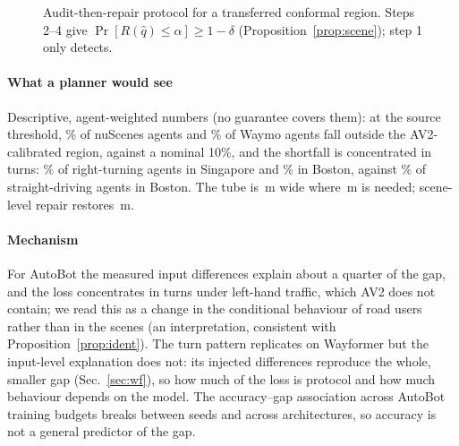 \begin{figure}[t]
\centering
{}
\caption{Audit-then-repair protocol for a transferred conformal region. Steps 2--4 give $\Pr[R(\hat q)\le\alpha]\ge1-\delta$
(Proposition~\ref{prop:scene}); step 1 only detects.}
\label{fig:protocol}
\end{figure}

\paragraph{What a planner would see} Descriptive, agent-weighted numbers (no guarantee covers them): at the source
threshold, \missAgentsAvNs\% of nuScenes agents and \missAgentsAvWm\% of Waymo agents fall outside the AV2-calibrated
region, against a nominal 10\%, and the shortfall is concentrated in turns: \missRightSg\% of right-turning agents in
Singapore and \missRightBos\% in Boston, against \missStraightBos\% of straight-driving agents in Boston. The tube is
\qSrcAvNs\,m wide where \qOracleAvNs\,m is needed; scene-level repair restores \recQAvNs\,m.

\paragraph{Mechanism} For AutoBot the measured input differences explain about a quarter of the gap, and the loss concentrates in
turns under left-hand traffic, which AV2 does not contain; we read this as a change in the conditional behaviour of road
users rather than in the scenes (an interpretation, consistent with Proposition~\ref{prop:ident}). The turn pattern replicates
on Wayformer but the input-level explanation does not: its injected differences reproduce the whole, smaller gap
(Sec.~\ref{sec:wf}), so how much of the loss is protocol and how much behaviour depends on the model. The accuracy--gap
association across AutoBot training budgets breaks between seeds and across architectures, so accuracy is not a general
predictor of the gap.

